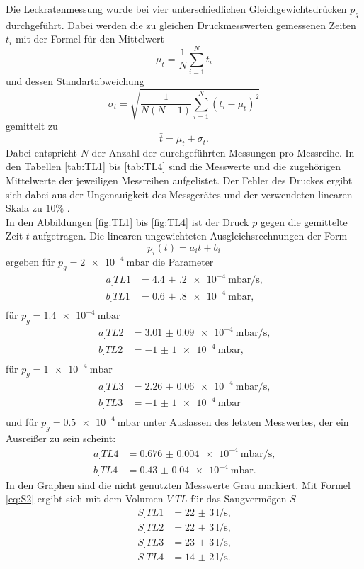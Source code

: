 Die Leckratenmessung wurde bei vier unterschiedlichen Gleichgewichtsdrücken $p_g$ durchgeführt. Dabei werden die zu gleichen Druckmesswerten gemessenen Zeiten $t_i$ mit der Formel für den Mittelwert
\[
\mu_t = \frac{1}{N}\sum_{i=1}^{N}t_i
\]
und dessen Standartabweichung
\[
\sigma_t = \sqrt{\frac{1}{N(N-1)}\sum_{i=1}^{N}(t_i-\mu_t)^2}
\]
gemittelt zu
\begin{equation}
\bar{t} = \mu_t\pm \sigma_t\text{.} \label{eq:tQuer}
\end{equation} 
Dabei entspricht $N$ der Anzahl der durchgeführten Messungen pro Messreihe.
In den Tabellen \ref{tab:TL1} bis \ref{tab:TL4} sind die Messwerte und die zugehörigen Mittelwerte der jeweiligen Messreihen aufgelistet. Der Fehler des Druckes ergibt sich dabei aus der Ungenauigkeit des Messgerätes und der verwendeten linearen Skala zu $10\%$ \cite{V70}.\\
In den Abbildungen \ref{fig:TL1} bis \ref{fig:TL4} ist der Druck $p$ gegen die gemittelte Zeit $\bar{t}$ aufgetragen.
Die linearen ungewichteten Ausgleichsrechnungen der Form
\[
p_i(t) = a_it+b_i
\]
ergeben für $p_g = \SI{2e-4}{\milli\bar}$ die Parameter
\begin{align*}
a_.{TL1} &= \SI{4.4(2)e-4}{\milli\bar\per\second} \text{,}\\
b_.{TL1} &= \SI{0.6(8)e-4}{\milli\bar} \text{,}\\
\end{align*}
für $p_g = \SI{1.4e-4}{\milli\bar}$
\begin{align*}
a_.{TL2} &= \SI{3.01(9)e-4}{\milli\bar\per\second} \text{,}\\
b_.{TL2} &= \SI{-1(1)e-4}{\milli\bar} \text{,}\\
\end{align*}
für $p_g = \SI{1e-4}{\milli\bar}$
\begin{align*}
a_.{TL3} &= \SI{2.26(6)e-4}{\milli\bar\per\second} \text{,}\\
b_.{TL3} &= \SI{-1(1)e-4}{\milli\bar} \\
\end{align*}
und für $p_g = \SI{0.5e-4}{\milli\bar}$ unter Auslassen des letzten Messwertes, der ein Ausreißer zu sein scheint:
\begin{align*}
a_.{TL4} &= \SI{0.676(4)e-4}{\milli\bar\per\second} \text{,}\\
b_.{TL4} &= \SI{0.43(4)e-4}{\milli\bar} \text{.}
\end{align*}
In den Graphen sind die nicht genutzten Messwerte Grau markiert.
Mit Formel \eqref{eq:S2} ergibt sich mit dem Volumen $V_.{TL}$ für das Saugvermögen $S$
\begin{align*}
S_.{TL1} &= \SI{22(3)}{\litre\per\second} \text{,}\\
S_.{TL2} &= \SI{22(3)}{\litre\per\second} \text{,}\\
S_.{TL3} &= \SI{23(3)}{\litre\per\second} \text{,}\\
S_.{TL4}   &= \SI{14(2)}{\litre\per\second} \text{.}
\end{align*}

